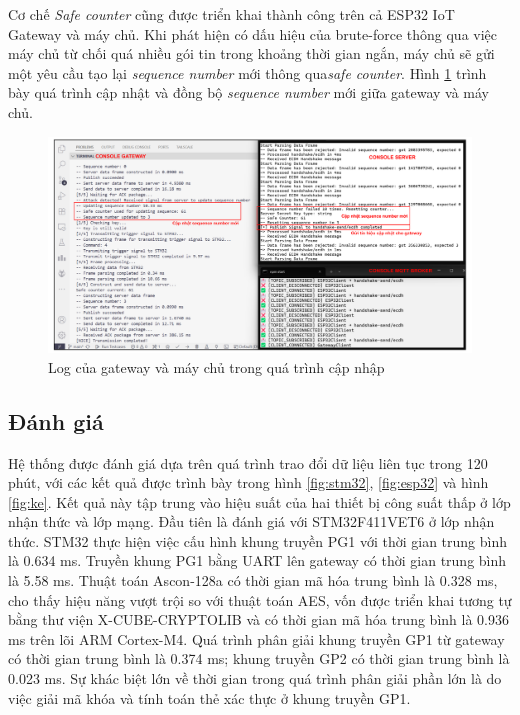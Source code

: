 Cơ chế \textit{Safe counter} cũng được triển khai thành công trên cả ESP32 IoT Gateway và máy chủ. Khi phát hiện có dấu hiệu của brute-force thông qua việc máy chủ từ chối quá nhiều gói tin trong khoảng thời gian ngắn, máy chủ sẽ gửi một yêu cầu tạo lại \textit{sequence number} mới thông qua\textit{safe counter}. Hình \ref{fig:sclog} trình bày quá trình cập nhật và đồng bộ \textit{sequence number} mới giữa gateway và máy chủ.

\begin{figure}[h]
    \centering
    \includegraphics[width=1\linewidth]{sclog.pdf}
    \caption{Log của gateway và máy chủ trong quá trình cập nhập}
    \label{fig:sclog}
\end{figure}

\subsection{Đánh giá}
\label{sec:res}
Hệ thống được đánh giá dựa trên quá trình trao đổi dữ liệu liên tục trong 120 phút, với các kết quả được trình bày trong hình \ref{fig:stm32}, \ref{fig:esp32} và hình \ref{fig:ke}. Kết quả này tập trung vào hiệu suất của hai thiết bị công suất thấp ở lớp nhận thức và lớp mạng. Đầu tiên là đánh giá với STM32F411VET6 ở lớp nhận thức. STM32 thực hiện việc cấu hình khung truyền PG1 với thời gian trung bình là 0.634 ms. Truyền khung PG1 bằng UART lên gateway có thời gian trung bình là 5.58 ms. Thuật toán Ascon-128a có thời gian mã hóa trung bình là 0.328 ms, cho thấy hiệu năng vượt trội so với thuật toán AES, vốn được triển khai tương tự bằng thư viện X-CUBE-CRYPTOLIB và có thời gian mã hóa trung bình là 0.936 ms trên lõi ARM Cortex-M4. Quá trình phân giải khung truyền GP1 từ gateway có thời gian trung bình là 0.374 ms; khung truyền GP2 có thời gian trung bình là 0.023 ms. Sự khác biệt lớn về thời gian trong quá trình phân giải phần lớn là do việc giải mã khóa và tính toán thẻ xác thực ở khung truyền GP1.

